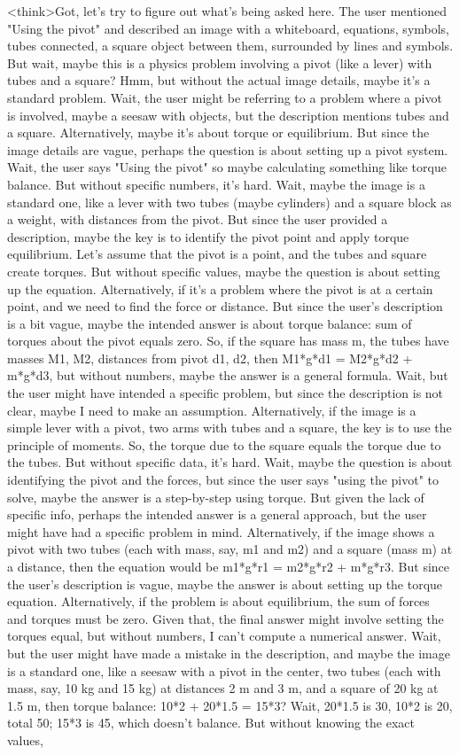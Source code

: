 <think>Got, let's try to figure out what's being asked here. The user mentioned "Using the pivot" and described an image with a whiteboard, equations, symbols, tubes connected, a square object between them, surrounded by lines and symbols. But wait, maybe this is a physics problem involving a pivot (like a lever) with tubes and a square? Hmm, but without the actual image details, maybe it's a standard problem. Wait, the user might be referring to a problem where a pivot is involved, maybe a seesaw with objects, but the description mentions tubes and a square. Alternatively, maybe it's about torque or equilibrium. But since the image details are vague, perhaps the question is about setting up a pivot system. Wait, the user says "Using the pivot" so maybe calculating something like torque balance. But without specific numbers, it's hard. Wait, maybe the image is a standard one, like a lever with two tubes (maybe cylinders) and a square block as a weight, with distances from the pivot. But since the user provided a description, maybe the key is to identify the pivot point and apply torque equilibrium. Let's assume that the pivot is a point, and the tubes and square create torques. But without specific values, maybe the question is about setting up the equation. Alternatively, if it's a problem where the pivot is at a certain point, and we need to find the force or distance. But since the user's description is a bit vague, maybe the intended answer is about torque balance: sum of torques about the pivot equals zero. So, if the square has mass m, the tubes have masses M1, M2, distances from pivot d1, d2, then M1*g*d1 = M2*g*d2 + m*g*d3, but without numbers, maybe the answer is a general formula. Wait, but the user might have intended a specific problem, but since the description is not clear, maybe I need to make an assumption. Alternatively, if the image is a simple lever with a pivot, two arms with tubes and a square, the key is to use the principle of moments. So, the torque due to the square equals the torque due to the tubes. But without specific data, it's hard. Wait, maybe the question is about identifying the pivot and the forces, but since the user says "using the pivot" to solve, maybe the answer is a step-by-step using torque. But given the lack of specific info, perhaps the intended answer is a general approach, but the user might have had a specific problem in mind. Alternatively, if the image shows a pivot with two tubes (each with mass, say, m1 and m2) and a square (mass m) at a distance, then the equation would be m1*g*r1 = m2*g*r2 + m*g*r3. But since the user's description is vague, maybe the answer is about setting up the torque equation. Alternatively, if the problem is about equilibrium, the sum of forces and torques must be zero. Given that, the final answer might involve setting the torques equal, but without numbers, I can't compute a numerical answer. Wait, but the user might have made a mistake in the description, and maybe the image is a standard one, like a seesaw with a pivot in the center, two tubes (each with mass, say, 10 kg and 15 kg) at distances 2 m and 3 m, and a square of 20 kg at 1.5 m, then torque balance: 10*2 + 20*1.5 = 15*3? Wait, 20*1.5 is 30, 10*2 is 20, total 50; 15*3 is 45, which doesn't balance. But without knowing the exact values, 